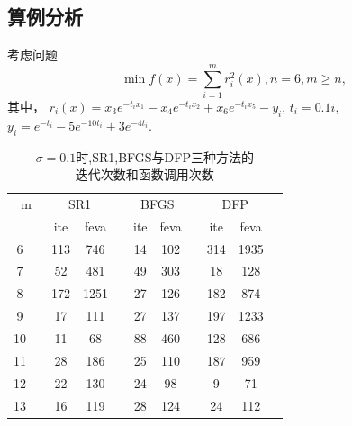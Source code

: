 \subsection{算例分析}
\begin{example}\label{nndfl}
    考虑问题
    \begin{equation}
        \min f(x) = \sum^m_{i=1}r_i^2(x), n=6,m\geq n,
        \nonumber
    \end{equation}
        其中，
        $r_i(x)=x_3e^{-t_ix_1}-x_4e^{-t_ix_2}+x_6e^{-t_ix_5}-y_i$,
        $t_i=0.1i$,
        $y_i=e^{-t_i}-5e^{-10t_i}+3e^{-4t_i}$.
    
    \begin{table}[htbp]\center
        \caption{$\sigma = 0.1$时,SR1,BFGS与DFP三种方法的
                \\迭代次数和函数调用次数}
        \begin{tabular}{cccccccccccc}
        \toprule %
            \multicolumn{3}{c}{m}& 
            \multicolumn{2}{c}{SR1}&&                  \multicolumn{2}{c}{BFGS}&&                 \multicolumn{2}{c}{DFP}&\\
        \cmidrule(lr){4-12}
            \multicolumn{2}{c}{}&&ite&feva&&ite&feva&&ite&feva&\\  %
        \hline %
            \multicolumn{2}{c}{6} & &113&746 & &14&102& &314&1935& \\
            \multicolumn{2}{c}{7} & &52 &481 & &49&303& &18 &128 & \\
            \multicolumn{2}{c}{8} & &172&1251& &27&126& &182&874 & \\
            \multicolumn{2}{c}{9} & &17 &111 & &27&137& &197&1233& \\
            \multicolumn{2}{c}{10}& &11 &68  & &88&460& &128&686 & \\
            \multicolumn{2}{c}{11}& &28 &186 & &25&110& &187&959 & \\
            \multicolumn{2}{c}{12}& &22 &130 & &24&98 & &9  &71  & \\
            \multicolumn{2}{c}{13}& &16 &119 & &28&124& &24 &112 & \\
        \bottomrule %
        \end{tabular}
        \label{nndf1}
    \end{table}
    

\end{example}
